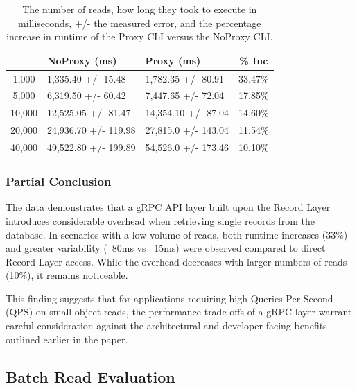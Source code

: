 \documentclass[sigconf]{acmart}
\begin{document}
\begin{table}[h]
\begin{tabular}{|c|l|l|c|}
    \hline
    \rowcolor[HTML]{656565} 
    \multicolumn{1}{|c}{\cellcolor[HTML]{656565}{\color[HTML]{FFFFFF} \textbf{N}}} &
    {\color[HTML]{FFFFFF} \textbf{NoProxy (ms)}} &
    {\color[HTML]{FFFFFF} \textbf{Proxy (ms)}} &
    {\color[HTML]{FFFFFF} \textbf{\% Inc}} \\ \hline
    1,000  & 1,335.40 +/- 15.48   & 1,782.35 +/- 80.91 & 33.47\% \\
    \rowcolor[HTML]{EFEFEF} 
    5,000  & 6,319.50 +/- 60.42   & 7,447.65 +/- 72.04 & 17.85\% \\
    10,000 & 12,525.05 +/- 81.47 & 14,354.10 +/- 87.04 & 14.60\% \\
    \rowcolor[HTML]{EFEFEF} 
    20,000 & 24,936.70 +/- 119.98 & 27,815.0 +/- 143.04  & 11.54\% \\
    40,000 & 49,522.80 +/- 199.89 & 54,526.0 +/- 173.46  & 10.10\% \\ \hline
\end{tabular}
\caption{The number of reads, how long they took to execute in milliseconds, +/- the measured error, and the percentage increase in runtime of the Proxy CLI versus the NoProxy CLI.}
\end{table}

\subsubsection{Partial Conclusion}

The data demonstrates that a gRPC API layer built upon the Record Layer introduces considerable overhead when retrieving single records from the database. In scenarios with a low volume of reads, both runtime increases (33\%) and greater variability (~80ms vs ~15ms) were observed compared to direct Record Layer access. While the overhead decreases with larger numbers of reads (10\%), it remains noticeable.

This finding suggests that for applications requiring high Queries Per Second (QPS) on small-object reads, the performance trade-offs of a gRPC layer warrant careful consideration against the architectural and developer-facing benefits outlined earlier in the paper.

\subsection{Batch Read Evaluation}
\end{document}
